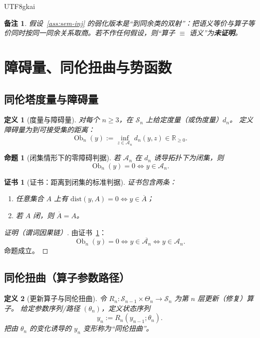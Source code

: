\documentclass[12pt]{article}
\newtheorem{definition}{定义}[section]
\newtheorem{proposition}{命题}[section]
\newtheorem{remark}{备注}[section]
\newtheorem{Certificate}{证书}[section]
\newcommand{\Ob}{\operatorname{Ob}}
\begin{document}
\begin{CJK*}{UTF8}{gkai}
\begin{remark}
假设~\ref{ass:sem-inj} 的弱化版本是“到同余类的双射”：把语义等价与算子等价同时按同一同余关系取商。若不作任何假设，则“算子 $\equiv$ 语义”为\textbf{未证明}。
\end{remark}

\section{障碍量、同伦扭曲与势函数}

\subsection{同伦塔度量与障碍量}

\begin{definition}[度量与障碍量]\label{def:ob-measure}
对每个 $n\ge3$，在 $\mathcal S_n$ 上给定度量（或伪度量）$d_n$。
定义障碍量为到可接受集的距离：
\[
\Ob_n(y):=\inf_{z\in\mathcal A_n} d_n(y,z)\in\mathbb R_{\ge0}.
\]
\end{definition}

\begin{proposition}[闭集情形下的零障碍判据]\label{prop:ob-zero-criterion}
若 $\mathcal A_n$ 在 $d_n$ 诱导拓扑下为闭集，则
\[
\Ob_n(y)=0\iff y\in\mathcal A_n.
\]
\end{proposition}

\begin{Certificate}[证书：距离到闭集的标准判据]\label{cert:ob-zero-criterion}
证书包含两条：
\begin{enumerate}
\item 任意集合 $A$ 上有 $\mathrm{dist}(y,A)=0\iff y\in\overline{A}$；
\item 若 $A$ 闭，则 $\overline{A}=A$。
\end{enumerate}
\end{Certificate}

\begin{proof}[证明（谓词因果链）]
由证书~\ref{cert:ob-zero-criterion}：
\[
\Ob_n(y)=0
\Longleftrightarrow
y\in\overline{\mathcal A_n}
\Longleftrightarrow
y\in\mathcal A_n.
\]
命题成立。
\end{proof}

\subsection{同伦扭曲（算子参数路径）}

\begin{definition}[更新算子与同伦扭曲]\label{def:twist}
令 $R_n:\mathcal S_{n-1}\times\Theta_n\to\mathcal S_n$ 为第 $n$ 层更新（修复）算子。
给定参数序列/路径 $(\theta_n)$，定义状态序列
\[
y_n:=R_n(y_{n-1};\theta_n).
\]
把由 $\theta_n$ 的变化诱导的 $y_n$ 变形称为“同伦扭曲”。
\end{definition}


\end{CJK*}
\end{document}
